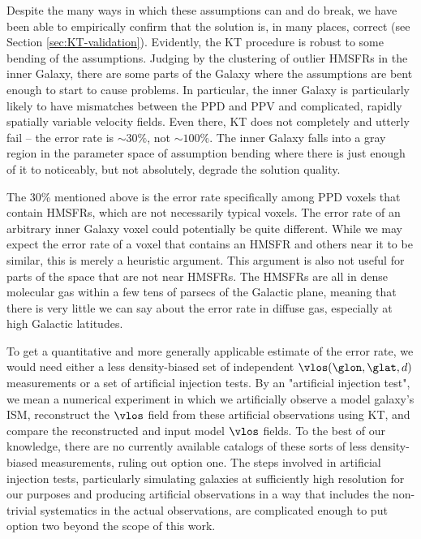 Despite the many ways in which these assumptions can and do break, we have been able to empirically confirm that the solution is, in many places, correct (see Section \ref{sec:KT-validation}). 
Evidently, the KT procedure is robust to some bending of the assumptions.
Judging by the clustering of outlier HMSFRs in the inner Galaxy, there are some parts of the Galaxy where the assumptions are bent enough to start to cause problems.
In particular, the inner Galaxy is particularly likely to have mismatches between the PPD and PPV and complicated, rapidly spatially variable velocity fields.
Even there, KT does not completely and utterly fail -- the error rate is $\sim 30 \%$, not $\sim 100 \%$.
The inner Galaxy falls into a gray region in the parameter space of assumption bending where there is just enough of it to noticeably, but not absolutely, degrade the solution quality.

The 30\% mentioned above is the error rate specifically among PPD voxels that contain HMSFRs, which are not necessarily typical voxels. 
The error rate of an arbitrary inner Galaxy voxel could potentially be quite different. 
While we may expect the error rate of a voxel that contains an HMSFR and others near it to be similar, this is merely a heuristic argument.
This argument is also not useful for parts of the space that are not near HMSFRs.
The HMSFRs are all in dense molecular gas within a few tens of parsecs of the Galactic plane, meaning that there is very little we can say about the error rate in diffuse gas, especially at high Galactic latitudes. 

To get a quantitative and more generally applicable estimate of the error rate, we would need either a less density-biased set of independent $\vlos(\glon, \glat, d)$ measurements or a set of artificial injection tests. 
By an "artificial injection test", we mean a numerical experiment in which we artificially observe a model galaxy's ISM, reconstruct the $\vlos$ field from these artificial observations using KT, and compare the reconstructed and input model $\vlos$ fields. 
To the best of our knowledge, there are no currently available catalogs of these sorts of less density-biased measurements, ruling out option one.
The steps involved in artificial injection tests, particularly simulating galaxies at sufficiently high resolution for our purposes and producing artificial observations in a way that includes the non-trivial systematics in the actual observations, are complicated enough to put option two beyond the scope of this work.

